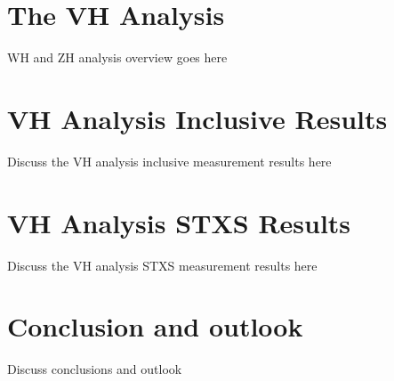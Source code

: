 \documentclass{umassthesis}          %
\begin{document}
\chapter{The VH Analysis}\label{ch:vh_analysis}
WH and ZH analysis overview goes here

\chapter{VH Analysis Inclusive Results}\label{ch:vh_inclusive_results}
Discuss the VH analysis inclusive measurement results here

\chapter{VH Analysis STXS Results}\label{ch:vh_stxs_results}
Discuss the VH analysis STXS measurement results here

\chapter{Conclusion and outlook}\label{ch:conclusions}
Discuss conclusions and outlook




\end{document}
